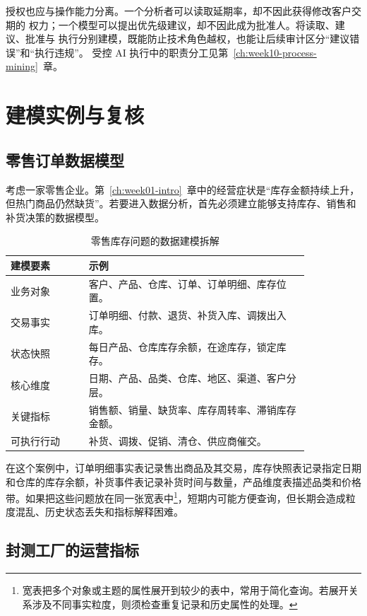 授权也应与操作能力分离。一个分析者可以读取延期率，却不因此获得修改客户交期的
权力；一个模型可以提出优先级建议，却不因此成为批准人。将读取、建议、批准与
执行分别建模，既能防止技术角色越权，也能让后续审计区分“建议错误”和“执行违规”。
受控 AI 执行中的职责分工见第~\ref{ch:week10-process-mining}~章。

\section{建模实例与复核}
\subsection{零售订单数据模型}

考虑一家零售企业。第~\ref{ch:week01-intro}~章中的经营症状是“库存金额持续上升，但热门商品仍然缺货”。若要进入数据分析，首先必须建立能够支持库存、销售和补货决策的数据模型。

\begin{table}[htbp]
\centering
\caption{零售库存问题的数据建模拆解}
\begin{tabular}{P{0.22\linewidth}P{0.62\linewidth}}
\toprule
{}
建模要素 & 示例\\
\midrule
业务对象 & 客户、产品、仓库、订单、订单明细、库存位置。\\
交易事实 & 订单明细、付款、退货、补货入库、调拨出入库。\\
状态快照 & 每日产品、仓库库存余额，在途库存，锁定库存。\\
核心维度 & 日期、产品、品类、仓库、地区、渠道、客户分层。\\
关键指标 & 销售额、销量、缺货率、库存周转率、滞销库存金额。\\
可执行行动 & 补货、调拨、促销、清仓、供应商催交。\\
\bottomrule
\end{tabular}
\end{table}

在这个案例中，订单明细事实表记录售出商品及其交易，库存快照表记录指定日期和仓库的库存余额，补货事件表记录补货时间与数量，产品维度表描述品类和价格带。如果把这些问题放在同一张宽表中\footnote{宽表把多个对象或主题的属性展开到较少的表中，常用于简化查询。若展开关系涉及不同事实粒度，则须检查重复记录和历史属性的处理。}，短期内可能方便查询，但长期会造成粒度混乱、历史状态丢失和指标解释困难。

\subsection{封测工厂的运营指标}

